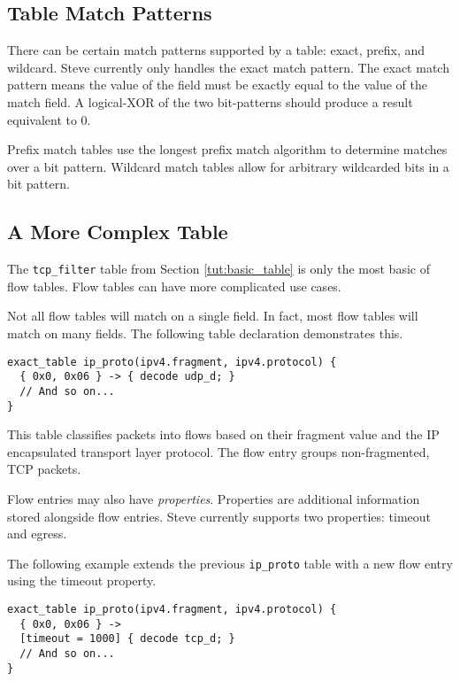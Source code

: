 \subsection{Table Match Patterns} \label{tut:match_patterns}

There can be certain match patterns supported by a table: exact, prefix, and wildcard. Steve currently only handles the exact match pattern. The exact match pattern means the value of the field must be exactly equal to the value of the match field. A logical-XOR of the two bit-patterns should produce a result equivalent to 0.

Prefix match tables use the longest prefix match algorithm to determine
matches over a bit pattern.
Wildcard match tables allow for arbitrary wildcarded bits in a bit pattern.

\subsection{A More Complex Table} \label{tut:complex_table}

The \texttt{tcp\_filter} table from Section \ref{tut:basic_table} is only the most basic of flow tables. 
Flow tables can have more complicated use cases.

Not all flow tables will match on a single field. In fact, most flow tables will
match on many fields. The following table declaration demonstrates this.

\begin{codepage}
\begin{lstlisting}
exact_table ip_proto(ipv4.fragment, ipv4.protocol) {
  { 0x0, 0x06 } -> { decode udp_d; }
  // And so on...
}
\end{lstlisting}
\end{codepage}

This table classifies packets into flows based on their fragment value
and the IP encapsulated transport layer protocol. The flow entry
groups non-fragmented, TCP packets.

Flow entries may also have \textit{properties}. Properties are additional
information stored alongside flow entries. 
Steve currently supports two properties: timeout and egress.

The following example extends the previous \texttt{ip\_proto} table with a new flow entry using the timeout property.

\begin{codepage}
\begin{lstlisting}
exact_table ip_proto(ipv4.fragment, ipv4.protocol) {
  { 0x0, 0x06 } ->
  [timeout = 1000] { decode tcp_d; }
  // And so on...
}
\end{lstlisting}
\end{codepage}

